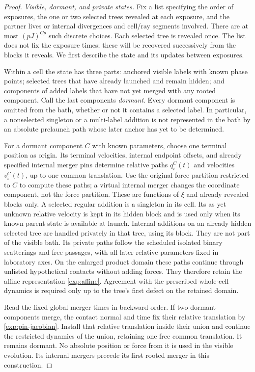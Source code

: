 \begin{proof}
\emph{Visible, dormant, and private states.}
Fix a list specifying the order of exposures, the one or two selected trees
revealed at each exposure, and the partner lives or internal divergences
and cell/ray segments involved.  There are at most $(pJ)^{Cp}$ such
discrete choices.  Each selected tree is revealed once.  The list does not fix
the exposure times; these will be recovered successively from the blocks
it reveals.  We first describe the state and its updates between exposures.

Within a cell the state has three parts:
anchored visible labels with known phase points; selected trees that have
already launched and remain hidden; and components of added labels that
have not yet merged with any rooted component.  Call the last components
\emph{dormant}.  Every dormant component is omitted from the bath, whether
or not it contains a selected label.  In particular, a nonselected
singleton or a multi-label addition is not represented in the bath by an
absolute prelaunch path whose later anchor has yet to be determined.

For a dormant component $C$ with known parameters, choose one terminal
position as origin.  Its terminal velocities, internal endpoint offsets,
and already specified internal merger pins determine relative paths
$q_i^C(t)$ and velocities $v_i^C(t)$, up to one common translation.  Use the
original force partition restricted to $C$ to compute these paths; a
virtual internal merger changes the coordinate component, not the force
partition.  These are functions of $\xi$ and already revealed blocks only.
A selected regular addition is a singleton in its cell.  Its as yet
unknown relative velocity is kept in its hidden block and is used only
when its known parent state is available at launch.  Internal additions
on an already hidden selected tree are handled privately in that tree,
using its block.  They are not part of the visible bath.  Its private paths
follow the scheduled isolated binary scatterings and free passages, with
all later relative parameters fixed in laboratory axes.  On the enlarged
product domain these paths continue through unlisted hypothetical contacts
without adding forces.  They therefore retain the affine representation
\eqref{exp:affine}.  Agreement with the prescribed whole-cell dynamics is
required only up to the tree's first defect on the retained domain.

Read the fixed global merger times in backward order.  If two dormant
components merge, the contact normal and time fix their relative
translation by \eqref{exp:pin-jacobian}.  Install that relative translation
inside their union and continue the restricted dynamics of the union,
retaining one free common translation.  It remains dormant.  No absolute
position or force from it is used in the visible evolution.  Its internal
mergers precede its first rooted merger in this construction.


\end{proof}

